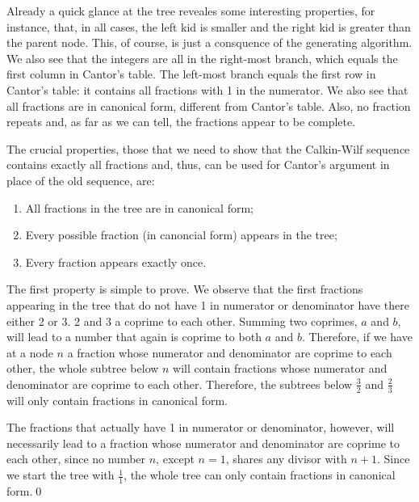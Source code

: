 \documentclass[tikz]{scrreprt}
\begin{document}
Already a quick glance at the tree
reveales some interesting properties,
for instance, that, in all cases,
the left kid is smaller and the right kid
is greater than the parent node.
This, of course, is just a consquence
of the generating algorithm.
We also see that the integers are all
in the right-most branch, which equals
the first column in Cantor's table.
The left-most branch equals the first row
in Cantor's table: it contains all fractions
with 1 in the numerator.
We also see that all fractions are in
canonical form, different from Cantor's table.
Also, no fraction repeats and, as far as we can tell,
the fractions appear to be complete.

The crucial properties, those that we need
to show that the Calkin-Wilf sequence contains
exactly all fractions and, thus, can be used
for Cantor's argument in place of the old sequence,
are:

\begin{enumerate}
\item All fractions in the tree are in canonical form;
\item Every possible fraction (in canoncial form) 
      appears in the tree;
\item Every fraction appears exactly once.
\end{enumerate}

The first property is simple to prove.
We observe that
the first fractions appearing in the tree 
that do not have
1 in numerator or denominator have
there either 2 or 3. 2 and 3 a coprime to each other.
Summing two coprimes, $a$ and $b$, will lead to a number
that again is coprime to both $a$ and $b$.
Therefore, if we have at a node $n$
a fraction whose numerator and denominator
are coprime to each other, the whole subtree
below $n$ will contain fractions whose
numerator and denominator are coprime to each other.
Therefore, the subtrees below $\frac{3}{2}$ and
$\frac{2}{3}$ will only contain fractions in canonical form.

The fractions that actually have 1 in 
numerator or denominator, however,
will necessarily lead to a fraction
whose numerator and denominator are coprime
to each other, since no number $n$, except $n=1$,
shares any divisor with $n+1$.
Since we start the tree with 
$\frac{1}{1}$, the whole tree can only contain
fractions in canonical form.\qed 
\end{document}
